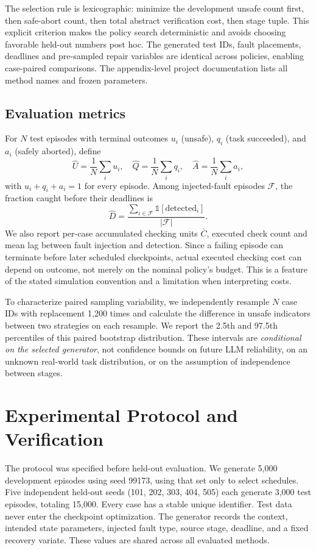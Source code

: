 \documentclass[conference]{IEEEtran}
\begin{document}
The selection rule is lexicographic: minimize the development unsafe count first, then safe-abort count, then total abstract verification cost, then stage tuple. This explicit criterion makes the policy search deterministic and avoids choosing favorable held-out numbers post hoc. The generated test IDs, fault placements, deadlines and pre-sampled repair variables are identical across policies, enabling case-paired comparisons. The appendix-level project documentation lists all method names and frozen parameters.

\subsection{Evaluation metrics}
For $N$ test episodes with terminal outcomes $u_i$ (unsafe), $q_i$ (task succeeded), and $a_i$ (safely aborted), define
\begin{equation}
\widehat{U}=\frac1N\sum_i u_i,\quad
\widehat{Q}=\frac1N\sum_i q_i,\quad
\widehat{A}=\frac1N\sum_i a_i,
\end{equation}
with $u_i+q_i+a_i=1$ for every episode. Among injected-fault episodes $\mathcal{F}$, the fraction caught before their deadlines is
\begin{equation}
\widehat{D}=\frac{\sum_{i\in\mathcal{F}}\mathbb{1}[\mathrm{detected}_i]}{|\mathcal{F}|}.
\end{equation}
We also report per-case accumulated checking units $\bar C$, executed check count and mean lag between fault injection and detection. Since a failing episode can terminate before later scheduled checkpoints, actual executed checking cost can depend on outcome, not merely on the nominal policy's budget. This is a feature of the stated simulation convention and a limitation when interpreting costs.

To characterize paired sampling variability, we independently resample $N$ case IDs with replacement 1,200 times and calculate the difference in unsafe indicators between two strategies on each resample. We report the 2.5th and 97.5th percentiles of this paired bootstrap distribution. These intervals are \emph{conditional on the selected generator}, not confidence bounds on future LLM reliability, on an unknown real-world task distribution, or on the assumption of independence between stages.

\section{Experimental Protocol and Verification}
The protocol was specified before held-out evaluation. We generate 5,000 development episodes using seed 99173, using that set only to select schedules. Five independent held-out seeds (101, 202, 303, 404, 505) each generate 3,000 test episodes, totaling 15,000. Every case has a stable unique identifier. Test data never enter the checkpoint optimization. The generator records the context, intended state parameters, injected fault type, source stage, deadline, and a fixed recovery variate. These values are shared across all evaluated methods.
\end{document}
